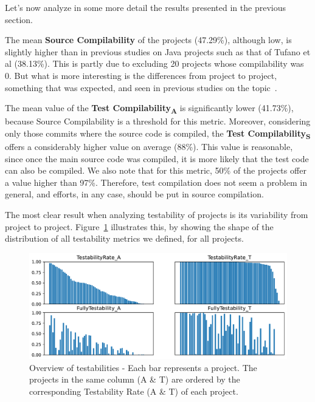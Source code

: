 Let's now analyze in some more detail the results presented in the previous section.

The mean \textbf{Source Compilability} of the projects (47.29\%), although low, is slightly higher than in previous studies on Java projects such as that of Tufano et al (38.13\%). 
This is partly due to excluding 20 projects whose compilability was 0.
But what is more interesting is the differences from project to project, something that was expected, and seen in previous studies on the topic~\cite{tufano2017there,sulir2020large,querel:2021:warning}.

The mean value of the \textbf{Test Compilability\textsubscript{A}} is significantly lower (41.73\%), because Source Compilability is a threshold for this metric.
Moreover, considering only those commits where the source code is compiled, the \textbf{Test Compilability\textsubscript{S}} offers a considerably higher value on average (88\%).
This value is reasonable, since once the main source code was compiled, it is more likely that the test code can also be compiled. 
We also note that for this metric, 50\% of the projects offer a value higher than 97\%.
Therefore, test compilation does not seem a problem in general, and efforts, in any case, should be put in source compilation.



The most clear result when analyzing testability of projects is its variability from project to project. 
Figure~\ref{fig:testability-overview} illustrates this, by showing the shape of the distribution of all testability metrics we defined, for all projects.

\begin{figure}[ht!]
    \centering    
    \includegraphics[width=\textwidth]{pages/02-Testability/images/Overview.pdf}
    \caption{Overview of testabilities - Each bar represents a project. The projects in the same column (A \& T) are ordered by the corresponding Testability Rate (A \& T) of each project.}
    \label{fig:testability-overview}
\end{figure}

